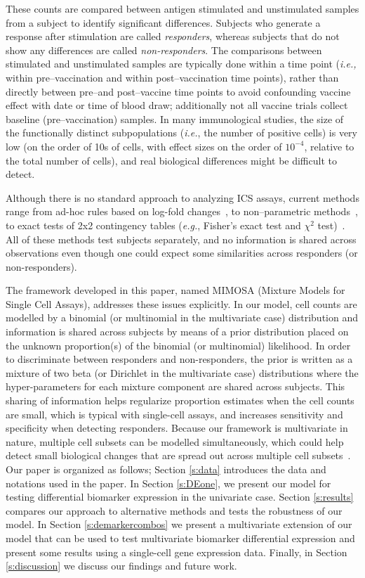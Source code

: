 \documentclass[12pt,oupdraft]{biostatistics}
\begin{document}
These counts are compared between antigen stimulated and unstimulated samples from a subject to identify significant differences. Subjects who generate a response after stimulation are called \textit{responders}, whereas subjects that do not show any differences are called \textit{non-responders}. The comparisons between stimulated and unstimulated samples are typically done within a time point (\textit{i.e.,} within pre--vaccination and within post--vaccination time points), rather than directly between pre--and post--vaccine time points to avoid confounding vaccine effect with date or time of blood draw; additionally not all vaccine trials collect baseline (pre--vaccination) samples.
In many immunological studies, the size of the functionally distinct subpopulations (\textit{i.e.}, the number of positive cells) is very low (on the order of 10s of cells, with effect sizes on the order of $10^{-4}$, relative to the total number of cells), and real biological differences might be difficult to detect.

Although there is no standard approach to analyzing ICS assays, current methods range from ad-hoc rules based on log-fold changes~\citep{Trigona:2003}, to non--parametric methods~\citep{Sinclair:2004hs}, to exact tests of 2x2 contingency tables (\textit{e.g.}, Fisher's exact test and $\chi^2$ test)~\citep{Horton:2007tsa,Proschan:2009ks,Peiperl:2010ej,Nason:2006dx}.
All of these methods test subjects separately, and no information is shared across observations even though one could expect some similarities across responders (or non-responders).

The framework developed in this paper, named MIMOSA (Mixture Models for Single Cell Assays), addresses these issues explicitly. In our model, cell counts are modelled by a binomial (or multinomial in the multivariate case) distribution and information is shared across subjects by means of a prior distribution placed on the unknown proportion(s) of the binomial (or multinomial) likelihood.
In order to discriminate between responders and non-responders, the prior is written as a mixture of two beta (or Dirichlet in the multivariate case) distributions where the hyper-parameters for each mixture component are shared across subjects.
This sharing of information helps regularize proportion estimates when the cell counts are small, which is typical with single-cell assays, and increases sensitivity and specificity when detecting responders.
Because our framework is multivariate in nature, multiple cell subsets can be modelled simultaneously, which could help detect small biological changes that are spread out across multiple cell subsets~\citep{Nason:2006dx}. Our paper is organized as follows; Section \ref{s:data} introduces the data and notations used in the paper. In Section \ref{s:DEone}, we present our model for testing differential biomarker expression in the univariate case. Section \ref{s:results} compares our approach to alternative methods and tests the robustness of our model. In Section \ref{s:demarkercombos} we present a multivariate extension of our model that can be used to test multivariate biomarker differential expression and present some results using a single-cell gene expression data. Finally, in Section \ref{s:discussion} we discuss our findings and future work.
\end{document}
